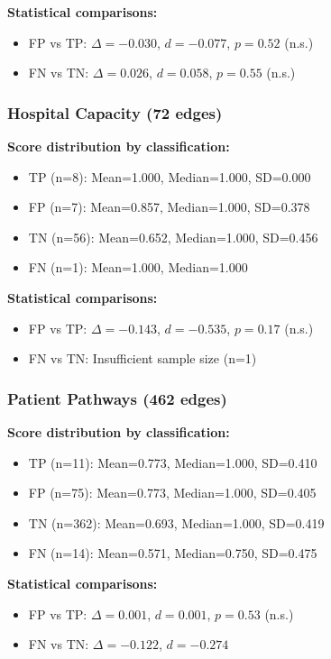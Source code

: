 \textbf{Statistical comparisons:}
\begin{itemize}
    \item FP vs TP: $\Delta = -0.030$, $d = -0.077$, $p = 0.52$ (n.s.)
    \item FN vs TN: $\Delta = 0.026$, $d = 0.058$, $p = 0.55$ (n.s.)
\end{itemize}

\subsubsection{Hospital Capacity (72 edges)}

\textbf{Score distribution by classification:}
\begin{itemize}
    \item TP (n=8): Mean=1.000, Median=1.000, SD=0.000
    \item FP (n=7): Mean=0.857, Median=1.000, SD=0.378
    \item TN (n=56): Mean=0.652, Median=1.000, SD=0.456
    \item FN (n=1): Mean=1.000, Median=1.000
\end{itemize}

\textbf{Statistical comparisons:}
\begin{itemize}
    \item FP vs TP: $\Delta = -0.143$, $d = -0.535$, $p = 0.17$ (n.s.)
    \item FN vs TN: Insufficient sample size (n=1)
\end{itemize}

\subsubsection{Patient Pathways (462 edges)}

\textbf{Score distribution by classification:}
\begin{itemize}
    \item TP (n=11): Mean=0.773, Median=1.000, SD=0.410
    \item FP (n=75): Mean=0.773, Median=1.000, SD=0.405
    \item TN (n=362): Mean=0.693, Median=1.000, SD=0.419
    \item FN (n=14): Mean=0.571, Median=0.750, SD=0.475
\end{itemize}

\textbf{Statistical comparisons:}
\begin{itemize}
    \item FP vs TP: $\Delta = 0.001$, $d = 0.001$, $p = 0.53$ (n.s.)
    \item FN vs TN: $\Delta = -0.122$, $d = -0.274$
\end{itemize}

